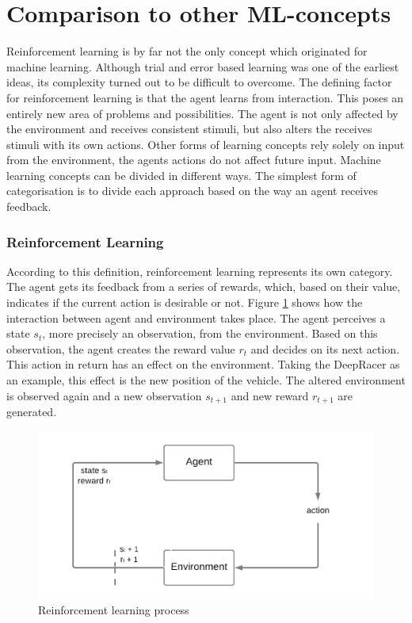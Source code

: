\section{Comparison to other ML-concepts}
Reinforcement learning is by far not the only concept which originated for machine learning. Although trial and error based learning was one of the earliest ideas, its complexity turned out to be difficult to overcome. The defining factor for reinforcement learning is that the agent learns from interaction. This poses an entirely new area of problems and possibilities. The agent is not only affected by the environment and receives consistent stimuli, but also alters the receives stimuli with its own actions. Other forms of learning concepts rely solely on input from the environment, the agents actions do not affect future input. Machine learning concepts can be divided in different ways. The simplest form of categorisation is to divide each approach based on the way an agent receives feedback.

\subsubsection{Reinforcement Learning}
According to this definition, reinforcement learning represents its own category. The agent gets its feedback from a series of rewards, which, based on their value, indicates if the current action is desirable or not. Figure \ref{fig:rl-concept} shows how the interaction between agent and environment takes place. The agent perceives a state \( s_t \), more precisely an observation, from the environment. Based on this observation, the agent creates the reward value \( r_t \) and decides on its next action. This action in return has an effect on the environment. Taking the DeepRacer as an example, this effect is the new position of the vehicle. The altered environment is observed again and a new observation \( s_{t+1} \) and new reward \( r_{t+1} \) are generated.

\begin{figure}
    \centering
    \includegraphics[width=.85\textwidth]{images/Dipl-Concept.png}
    \caption{Reinforcement learning process}
    \label{fig:rl-concept}
\end{figure}

